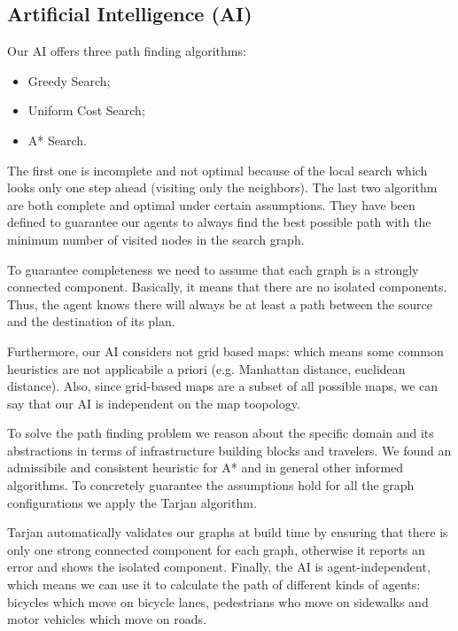 \subsection{Artificial Intelligence (AI)}

Our AI offers three path finding algorithms:
\begin{itemize}
  \item Greedy Search;
  \item Uniform Cost Search;
  \item A* Search.
\end{itemize}

The first one is incomplete and not optimal because of the local search which looks only one step ahead (visiting
only the neighbors). The last two algorithm are both complete and optimal under certain assumptions. They have been defined
to guarantee our agents to always find the best possible path with the minimum number of visited nodes in the search graph.

To guarantee completeness we need to assume that each graph is a strongly
connected component. Basically, it means that there are no isolated
components. Thus, the agent knows there will always be at least a path between
the source and the destination of its plan. %

Furthermore, our AI considers not grid based maps: which means some common
heuristics are not applicabile a priori (e.g. Manhattan distance, euclidean
distance). Also, since grid-based maps are a subset of all possible maps, we
can say that our AI is independent on the map toopology.

To solve the path finding problem we reason about the specific domain and its
abstractions in terms of infrastructure building blocks and travelers. We
found an admissibile and consistent heuristic for A* and in general other
informed algorithms. To concretely guarantee the assumptions hold for all the
graph configurations we apply the Tarjan algorithm.

Tarjan automatically validates our graphs at build time by ensuring that there
is only one strong connected component for each graph, otherwise it reports
an error and shows the isolated component.
Finally, the AI is agent-independent, which means we can use it to calculate
the path of different kinds of agents: bicycles which move on bicycle lanes,
pedestrians who move on sidewalks and motor vehicles which move on roads.
